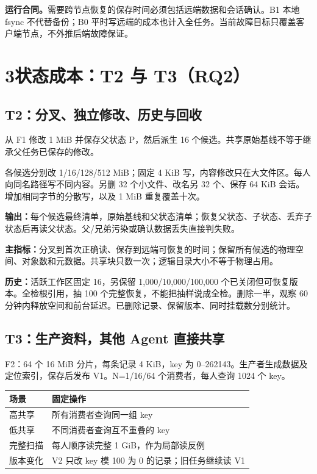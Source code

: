 \documentclass[UTF8,11pt,a4paper,fontset=windows]{ctexart}
\begin{document}
\textbf{运行合同。}需要跨节点恢复的保存时间必须包括远端数据和会话确认。B1 本地 fsync 不代替备份；B0 平时写远端的成本也计入全任务。当前故障目标只覆盖客户端节点，不外推后端故障保证。
\newpage

\section*{3\quad 状态成本：T2 与 T3（RQ2）}
\subsection*{T2：分叉、独立修改、历史与回收}
从 F1 修改 1 MiB 并保存父状态 P，然后派生 16 个候选。共享原始基线不等于继承父任务已保存的修改。

各候选分别改 1/16/128/512 MiB；固定 4 KiB 写，内容修改只在大文件区。每人向同名路径写不同内容。另删 32 个小文件、改名另 32 个、保存 64 KiB 会话。增加相同字节的分散写，以及 1 MiB 重复覆盖十次。

\textbf{输出：}每个候选最终清单，原始基线和父状态清单；恢复父状态、子状态、丢弃子状态后再读父状态。父/兄弟污染或确认数据丢失直接判失败。

\textbf{主指标：}分叉到首次正确读、保存到远端可恢复的时间；保留所有候选的物理空间、对象数和元数据。共享块只数一次；逻辑目录大小不等于物理占用。

\textbf{历史：}活跃工作区固定 16，另保留 1,000/10,000/100,000 个已关闭但可恢复版本。全检根引用，抽 100 个完整恢复，不能把抽样说成全检。删除一半，观察 60 分钟内释放空间和前台延迟。已删除记录、保留版本、同时挂载数分别统计。

\subsection*{T3：生产资料，其他 Agent 直接共享}
F2：64 个 16 MiB 分片，每条记录 4 KiB，key 为 0--262143。生产者生成数据及定位索引，保存后发布 V1。N=1/16/64 个消费者，每人查询 1024 个 key。

{\small\begin{tabularx}{\linewidth}{@{}P{28mm}Y@{}}
\toprule
场景 & 固定操作\\
\midrule
高共享 & 所有消费者查询同一组 key\\
低共享 & 不同消费者查询互不重叠的 key\\
完整扫描 & 每人顺序读完整 1 GiB，作为局部读反例\\
版本变化 & V2 只改 key 模 100 为 0 的记录；旧任务继续读 V1\\
\bottomrule
\end{tabularx}}
\end{document}
